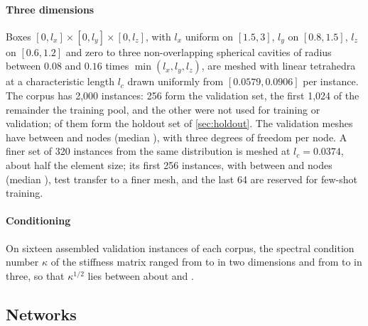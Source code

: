 \paragraph{Three dimensions}
Boxes $[0,l_x]\times[0,l_y]\times[0,l_z]$, with $l_x$ uniform on $[1.5,3]$, $l_y$ on
$[0.8,1.5]$, $l_z$ on $[0.6,1.2]$ and zero to three non-overlapping spherical cavities of
radius between $0.08$ and $0.16$ times $\min(l_x,l_y,l_z)$, are meshed with linear
tetrahedra at a characteristic length $l_c$ drawn uniformly from $[0.0579,0.0906]$ per
instance. The corpus has 2,000 instances: 256 form the validation set, the first 1,024 of
the remainder the training pool, and the other \numHoldThreeTail{} were not used for
training or validation; \numHoldThreeN{} of them form the holdout set of \cref{sec:holdout}.
The validation meshes have between \numNodesInMin{} and \numNodesInMax{} nodes (median
\numNodesInMedian{}), with three degrees of freedom per node. A finer set of 320 instances
from the same distribution is meshed at $l_c=0.0374$, about half the element size; its first
256 instances, with between \numNodesFineMin{} and \numNodesFineMax{} nodes (median
\numNodesFineMedian{}), test transfer to a finer mesh, and the last 64 are reserved for
few-shot training.

\paragraph{Conditioning}
On sixteen assembled validation instances of each corpus, the spectral condition number
$\kappa$ of the stiffness matrix ranged from \numKappaTwoLow{} to \numKappaTwoHigh{} in two
dimensions and from \numKappaThreeLow{} to \numKappaThreeHigh{} in three, so that
$\kappa^{1/2}$ lies between about \numSqrtKappaMin{} and \numSqrtKappaMax{}.

\subsection{Networks}\label{sec:methods:networks}

